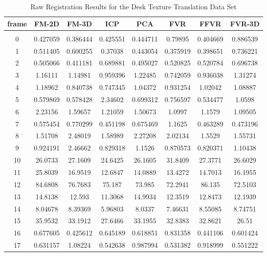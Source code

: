 \begin{center}
\begin{longtable}{cccccccc}
\caption{Raw Registration Results for the Desk Texture Translation Data Set}
\label{tab:desktexturetranslationFULL}
\endfirsthead
\endhead
\textbf{frame} & \textbf{FM-2D} & \textbf{FM-3D} & \textbf{ICP} & \textbf{PCA} & \textbf{FVR} & \textbf{FFVR} & \textbf{FVR-3D} \\
\hline \\
0 & 0.427059 & 0.386444 & 0.425551 & 0.444711 & 0.79895 & 0.404669 & 0.886539\\
1 & 0.511405 & 0.600255 & 0.37038 & 0.443054 & 0.375919 & 0.398651 & 0.736221\\
2 & 0.505066 & 0.411181 & 0.689881 & 0.495027 & 0.520825 & 0.520784 & 0.696738\\
3 & 1.16111 & 1.14981 & 0.959396 & 1.22485 & 0.742059 & 0.936038 & 1.31274\\
4 & 1.18962 & 0.840738 & 0.747345 & 1.04372 & 0.931254 & 1.02042 & 1.08887\\
5 & 0.579869 & 0.578428 & 2.34602 & 0.699312 & 0.756597 & 0.534477 & 1.0598\\
6 & 2.23156 & 1.59657 & 1.21059 & 1.50673 & 1.0997 & 1.1579 & 1.09505\\
7 & 0.575454 & 0.770299 & 0.451198 & 0.675469 & 1.1625 & 0.463289 & 0.473196\\
8 & 1.51708 & 2.48019 & 1.58989 & 2.27208 & 2.02134 & 1.5529 & 1.55731\\
9 & 0.924191 & 2.46662 & 0.829318 & 1.1526 & 0.870573 & 0.820371 & 1.10438\\
10 & 26.0733 & 27.1609 & 24.6425 & 26.1605 & 31.8409 & 27.3771 & 26.6029\\
11 & 25.8039 & 16.9519 & 12.6847 & 14.0889 & 13.4272 & 14.7013 & 16.1955\\
12 & 84.6808 & 76.7683 & 75.187 & 73.985 & 72.2941 & 86.135 & 72.5103\\
13 & 14.8138 & 12.593 & 11.3068 & 14.9934 & 12.3519 & 12.8473 & 12.1939\\
14 & 8.04678 & 8.39369 & 5.96803 & 8.0337 & 7.46631 & 8.55085 & 8.74751\\
15 & 35.9532 & 33.1912 & 27.6466 & 33.1955 & 32.8383 & 32.8621 & 26.51\\
16 & 0.677605 & 0.425612 & 0.645189 & 0.618851 & 0.831358 & 0.441106 & 0.601424\\
17 & 0.631157 & 1.08224 & 0.542638 & 0.987994 & 0.531382 & 0.918999 & 0.551222\\

\end{longtable}
\end{center}
